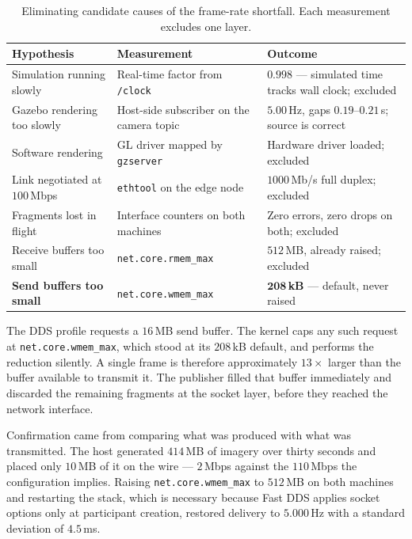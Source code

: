 \begin{table}[htbp]
\centering
\caption{Eliminating candidate causes of the frame-rate shortfall. Each
measurement excludes one layer.}
\label{tab:test-wmem}
\begin{tabular}{@{}p{34mm}p{40mm}p{40mm}@{}}
\toprule
Hypothesis & Measurement & Outcome \\
\midrule
Simulation running slowly
  & Real-time factor from \texttt{/clock}
  & \(0.998\) --- simulated time tracks wall clock; excluded \\[3pt]
Gazebo rendering too slowly
  & Host-side subscriber on the camera topic
  & \(5.00\)\,Hz, gaps \(0.19\)--\(0.21\)\,s; source is correct \\[3pt]
Software rendering
  & GL driver mapped by \texttt{gzserver}
  & Hardware driver loaded; excluded \\[3pt]
Link negotiated at $100$\,Mbps
  & \texttt{ethtool} on the edge node
  & $1000$\,Mb/s full duplex; excluded \\[3pt]
Fragments lost in flight
  & Interface counters on both machines
  & Zero errors, zero drops on both; excluded \\[3pt]
Receive buffers too small
  & \texttt{net.core.rmem\_max}
  & $512$\,MB, already raised; excluded \\[3pt]
\textbf{Send buffers too small}
  & \texttt{net.core.wmem\_max}
  & \(\mathbf{208}\)\,\textbf{kB} --- default, never raised \\
\bottomrule
\end{tabular}
\end{table}

The DDS profile requests a \(16\)\,MB send buffer. The kernel caps any such
request at \texttt{net.core.wmem\_max}, which stood at its \(208\)\,kB
default, and performs the reduction silently. A single frame is therefore
approximately \(13\times\) larger than the buffer available to transmit it.
The publisher filled that buffer immediately and discarded the remaining
fragments at the socket layer, before they reached the network interface.

Confirmation came from comparing what was produced with what was
transmitted. The host generated \(414\)\,MB of imagery over thirty seconds
and placed only \(10\)\,MB of it on the wire --- \(2\)\,Mbps against the
\(110\)\,Mbps the configuration implies. Raising
\texttt{net.core.wmem\_max} to \(512\)\,MB on both machines and restarting
the stack, which is necessary because Fast DDS applies socket options only
at participant creation, restored delivery to \(5.000\)\,Hz with a standard
deviation of \(4.5\)\,ms.

